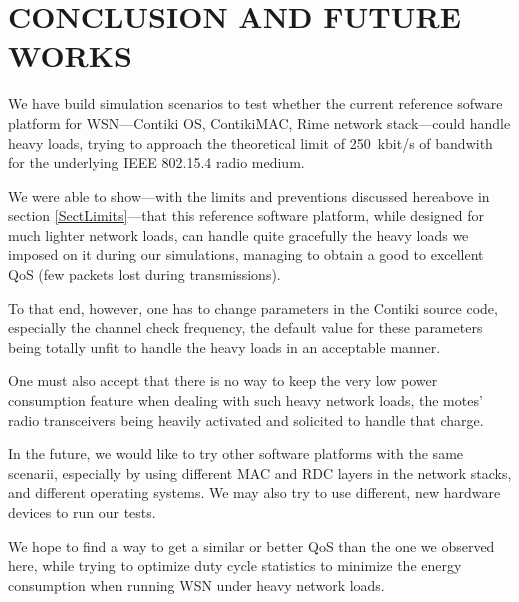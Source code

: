 \documentclass[a4paper,twoside]{article}
\begin{document}

\section{\uppercase{Conclusion and Future Works}}

We have build simulation scenarios to test whether the current reference
sofware platform for WSN---Contiki OS, ContikiMAC, Rime network
stack---could handle heavy loads, trying to approach the theoretical
limit of 250~kbit/s of bandwith for the underlying IEEE 802.15.4
radio medium.

We were able to show---with the limits and preventions discussed hereabove
in section \ref{SectLimits}---that this reference software platform, while
designed for much lighter network loads, can handle quite gracefully the
heavy loads we imposed on it during our simulations, managing to obtain
a good to excellent QoS (few packets lost during transmissions).

To that end, however, one has to change parameters in the Contiki source
code, especially the channel check frequency, the default value for these
parameters being totally unfit to handle the heavy loads in an acceptable
manner.

One must also accept that there is no way to keep the very low power
consumption feature when dealing with such heavy network loads, the
motes' radio transceivers being heavily activated and solicited to
handle that charge.

\medskip

In the future, we would like to try other software platforms with the same
scenarii, especially by using different MAC and RDC layers in the network
stacks, and different operating systems. We may also try to use different,
new hardware devices to run our tests.

We hope to find a way to get a similar or better QoS than the one we observed
here, while trying to optimize duty cycle statistics to minimize the energy
consumption when running WSN under heavy network loads.




\vfill

{\small
}
\end{document}

